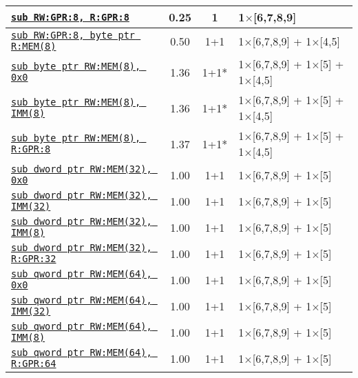 \documentclass[a4paper,english,fontsize=9]{scrartcl}
\begin{document}
\begin{longtable}{p{}ccL{.25\textwidth}}
  \midrule
  \texttt{\href{https://felixcloutier.com/x86/SUB.html}{sub RW:GPR:8, R:GPR:8}} & 0.25 & 1 & 1\(\times\)[6,7,8,9] \\
  \midrule
  \texttt{\href{https://felixcloutier.com/x86/SUB.html}{sub RW:GPR:8, byte ptr R:MEM(8)}} & 0.50 & 1+1 & 1\(\times\)[6,7,8,9] + 1\(\times\)[4,5] \\
  \midrule
  \texttt{\href{https://felixcloutier.com/x86/SUB.html}{sub byte ptr RW:MEM(8), 0x0}} & 1.36 & 1+1* & 1\(\times\)[6,7,8,9] + 1\(\times\)[5] + 1\(\times\)[4,5] \\
  \midrule
  \texttt{\href{https://felixcloutier.com/x86/SUB.html}{sub byte ptr RW:MEM(8), IMM(8)}} & 1.36 & 1+1* & 1\(\times\)[6,7,8,9] + 1\(\times\)[5] + 1\(\times\)[4,5] \\
  \midrule
  \texttt{\href{https://felixcloutier.com/x86/SUB.html}{sub byte ptr RW:MEM(8), R:GPR:8}} & 1.37 & 1+1* & 1\(\times\)[6,7,8,9] + 1\(\times\)[5] + 1\(\times\)[4,5] \\
  \midrule
  \texttt{\href{https://felixcloutier.com/x86/SUB.html}{sub dword ptr RW:MEM(32), 0x0}} & 1.00 & 1+1 & 1\(\times\)[6,7,8,9] + 1\(\times\)[5] \\
  \midrule
  \texttt{\href{https://felixcloutier.com/x86/SUB.html}{sub dword ptr RW:MEM(32), IMM(32)}} & 1.00 & 1+1 & 1\(\times\)[6,7,8,9] + 1\(\times\)[5] \\
  \midrule
  \texttt{\href{https://felixcloutier.com/x86/SUB.html}{sub dword ptr RW:MEM(32), IMM(8)}} & 1.00 & 1+1 & 1\(\times\)[6,7,8,9] + 1\(\times\)[5] \\
  \midrule
  \texttt{\href{https://felixcloutier.com/x86/SUB.html}{sub dword ptr RW:MEM(32), R:GPR:32}} & 1.00 & 1+1 & 1\(\times\)[6,7,8,9] + 1\(\times\)[5] \\
  \midrule
  \texttt{\href{https://felixcloutier.com/x86/SUB.html}{sub qword ptr RW:MEM(64), 0x0}} & 1.00 & 1+1 & 1\(\times\)[6,7,8,9] + 1\(\times\)[5] \\
  \midrule
  \texttt{\href{https://felixcloutier.com/x86/SUB.html}{sub qword ptr RW:MEM(64), IMM(32)}} & 1.00 & 1+1 & 1\(\times\)[6,7,8,9] + 1\(\times\)[5] \\
  \midrule
  \texttt{\href{https://felixcloutier.com/x86/SUB.html}{sub qword ptr RW:MEM(64), IMM(8)}} & 1.00 & 1+1 & 1\(\times\)[6,7,8,9] + 1\(\times\)[5] \\
  \midrule
  \texttt{\href{https://felixcloutier.com/x86/SUB.html}{sub qword ptr RW:MEM(64), R:GPR:64}} & 1.00 & 1+1 & 1\(\times\)[6,7,8,9] + 1\(\times\)[5] \\
  \midrule

\end{longtable}
\end{document}
